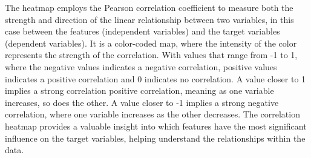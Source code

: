 The heatmap employs the Pearson correlation coefficient to measure both the strength and direction of the linear relationship between two variables, in this case between the features
(independent variables) and the target variables (dependent variables). It is a color-coded map, where the intensity of the color represents the strength of the correlation.
With values that range from -1 to 1, where the negative values indicates a negative correlation, positive values indicates a positive correlation and 0 indicates no correlation.
A value closer to 1 implies a strong correlation positive correlation, meaning as one variable increases, so does the other. 
A value closer to -1 implies a strong negative correlation,
where one variable increases as the other decreases. The correlation heatmap provides a valuable insight into which features have the most
significant influence on the target variables, helping understand the relationships within the data. \cite{inglis2022visualizing}

